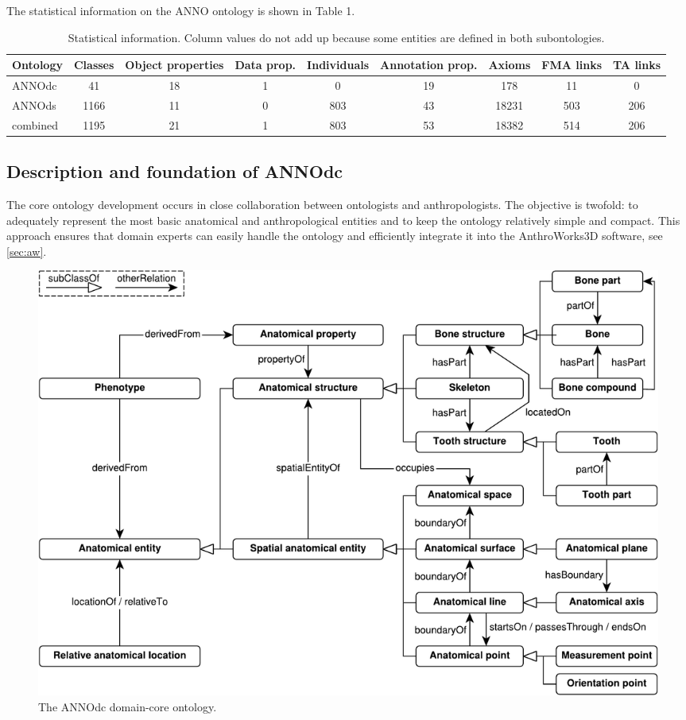 \documentclass[sw]{iosart2x}
\newcommand{\aw}{AnthroWorks3D}
\begin{document}
The statistical information on the ANNO ontology is shown in Table 1.

\begin{table}[b]
\centering
\caption{Statistical information. Column values do not add up because some entities are defined in both subontologies.}
\label{tab:stats}
\begin{tabulary}{\textwidth}{lSSSSSSSS}
\toprule
Ontology	&\textnormal{Classes}	&\textnormal{Object properties}	&\textnormal{Data prop.}	&\textnormal{Individuals}	&\textnormal{Annotation prop.}	&\textnormal{Axioms}	&\textnormal{FMA links}				&\textnormal{TA links}\\
\midrule
ANNOdc		&41						&18								&1								&0							&19									&178					&11							&0\\
ANNOds		&1166					&11								&0								&803						&43									&18231					&503						&206\\
\midrule
combined	&1195					&21								&1								&803						&53									&18382					&514						&206\\
\bottomrule
\end{tabulary}
\end{table}


\subsection{Description and foundation of ANNOdc}\label{sec:annodc}
The core ontology development occurs in close collaboration between ontologists and anthropologists.
The objective is twofold: to adequately represent the most basic anatomical and anthropological entities and to keep the ontology relatively simple and compact.
This approach ensures that domain experts can easily handle the ontology and efficiently integrate it into the \aw{} software, see \cref{sec:aw}.

\begin{figure}[h]
\includegraphics[width=\textwidth]{img/core.pdf}
\caption{The ANNOdc domain-core ontology.}\label{fig:annodc}
\end{figure}
\end{document}
